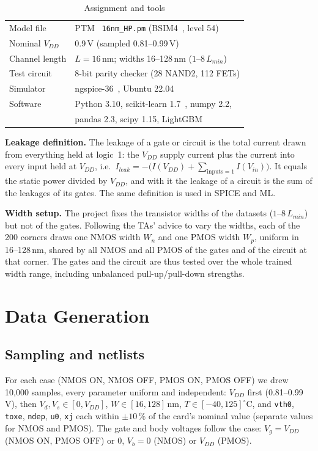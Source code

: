 ﻿\documentclass[conference,10pt]{IEEEtran}
\newcommand{\cc}[1]{\texttt{#1}}
\newcommand{\pct}{\,\%}
\begin{document}
\begin{table}[!htb]
\caption{Assignment and tools}
\label{tab:setup}
\centering
\begin{tabular}{@{}ll@{}}
\toprule
Model file & PTM~\cite{ptm} \cc{16nm\_HP.pm} (BSIM4~\cite{bsim4}, level 54)\\
Nominal $V_{DD}$ & 0.9\,V (sampled 0.81--0.99\,V)\\
Channel length & $L=16$\,nm; widths 16--128\,nm ($1$--$8\,L_{min}$)\\
Test circuit & 8-bit parity checker (28 NAND2, 112 FETs)\\
Simulator & ngspice-36~\cite{ngspice}, Ubuntu 22.04\\
Software & Python 3.10, scikit-learn 1.7~\cite{sklearn}, numpy 2.2,\\
 & pandas 2.3, scipy 1.15, LightGBM~\cite{lgbm}\\
\bottomrule
\end{tabular}
\end{table}

\textbf{Leakage definition.} The leakage of a gate or circuit is the total current drawn from
everything held at logic~1: the $V_{DD}$ supply current plus the current into every input held at
$V_{DD}$, i.e.\ $I_{leak}=-\big(I(V_{DD})+\sum_{\text{inputs}=1} I(V_{in})\big)$. It equals the static
power divided by $V_{DD}$, and with it the leakage of a circuit is the sum of the leakages of its
gates. The same definition is used in SPICE and ML.

\textbf{Width setup.} The project fixes the transistor widths of the datasets
($1$--$8\,L_{min}$) but not of the gates. Following the TAs' advice to vary the widths, each of the
200 corners draws one NMOS width $W_n$ and one PMOS width $W_p$, uniform in 16--128\,nm, shared by
all NMOS and all PMOS of the gates and of the circuit at that corner. The gates and the circuit are
thus tested over the whole trained width range, including unbalanced pull-up/pull-down strengths.

\section{Data Generation}

\subsection{Sampling and netlists}
For each case (NMOS ON, NMOS OFF, PMOS ON, PMOS OFF) we drew 10,000 samples, every parameter
uniform and independent: $V_{DD}$ first (0.81--0.99\,V), then $V_d, V_s\in[0,V_{DD}]$,
$W\in[16,128]$\,nm, $T\in[-40,125]^\circ$C, and \cc{vth0}, \cc{toxe}, \cc{ndep}, \cc{u0}, \cc{xj}
each within $\pm10\pct$ of the card's nominal value (separate values for NMOS and PMOS). The gate
and body voltages follow the case: $V_g=V_{DD}$ (NMOS ON, PMOS OFF) or 0, $V_b=0$ (NMOS) or
$V_{DD}$ (PMOS).
\end{document}
